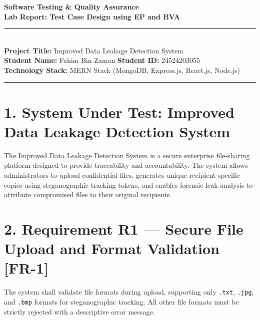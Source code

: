 \documentclass[11pt,a4paper]{article}
\begin{document}
\begin{center}
    {\LARGE \textbf{Software Testing \& Quality Assurance}}\\[4pt]
    {\Large \textbf{Lab Report: Test Case Design using EP and BVA}}\\[8pt]
    \rule{\textwidth}{1pt}\\[6pt]
    \textbf{Project Title:} Improved Data Leakage Detection System\\
    \textbf{Student Name:} Fahim Bin Zaman \quad\textbar\quad \textbf{Student ID:} 24524203055\\
    \textbf{Technology Stack:} MERN Stack (MongoDB, Express.js, React.js, Node.js)\\
    \rule{\textwidth}{1pt}
\end{center}

\vspace{0.8em}

\section*{1. System Under Test: Improved Data Leakage Detection System}
The Improved Data Leakage Detection System is a secure enterprise file-sharing platform designed to provide traceability and accountability. The system allows administrators to upload confidential files, generates unique recipient-specific copies using steganographic tracking tokens, and enables forensic leak analysis to attribute compromised files to their original recipients.

\vspace{0.5em}

\section*{2. Requirement R1 --- Secure File Upload and Format Validation [FR-1]}
The system shall validate file formats during upload, supporting only \texttt{.txt}, \texttt{.jpg}, and \texttt{.bmp} formats for steganographic tracking. All other file formats must be strictly rejected with a descriptive error message.

\vspace{0.5em}
\end{document}
